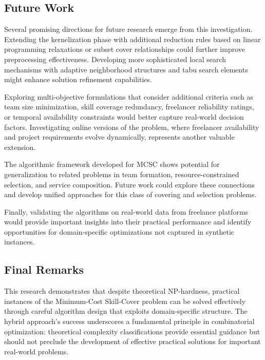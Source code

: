 \documentclass[12pt,a4paper]{article}
\begin{document}
\subsection{Future Work}
\label{subsec:future-work}

Several promising directions for future research emerge from this investigation. Extending the kernelization phase with additional reduction rules based on linear programming relaxations or subset cover relationships could further improve preprocessing effectiveness. Developing more sophisticated local search mechanisms with adaptive neighborhood structures and tabu search elements might enhance solution refinement capabilities.

Exploring multi-objective formulations that consider additional criteria such as team size minimization, skill coverage redundancy, freelancer reliability ratings, or temporal availability constraints would better capture real-world decision factors. Investigating online versions of the problem, where freelancer availability and project requirements evolve dynamically, represents another valuable extension.

The algorithmic framework developed for MCSC shows potential for generalization to related problems in team formation, resource-constrained selection, and service composition. Future work could explore these connections and develop unified approaches for this class of covering and selection problems.

Finally, validating the algorithms on real-world data from freelance platforms would provide important insights into their practical performance and identify opportunities for domain-specific optimizations not captured in synthetic instances.

\subsection{Final Remarks}
\label{subsec:final-remarks}

This research demonstrates that despite theoretical NP-hardness, practical instances of the Minimum-Cost Skill-Cover problem can be solved effectively through careful algorithm design that exploits domain-specific structure. The hybrid approach's success underscores a fundamental principle in combinatorial optimization: theoretical complexity classifications provide essential guidance but should not preclude the development of effective practical solutions for important real-world problems.
\end{document}
